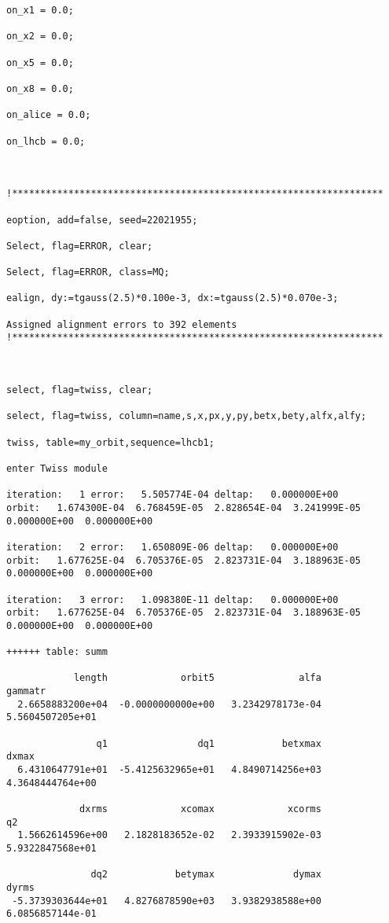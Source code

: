 \begin{verbatim}
on_x1 = 0.0;

on_x2 = 0.0;

on_x5 = 0.0;

on_x8 = 0.0;

on_alice = 0.0;

on_lhcb = 0.0;



!******************************************************************

eoption, add=false, seed=22021955;

Select, flag=ERROR, clear;

Select, flag=ERROR, class=MQ;

ealign, dy:=tgauss(2.5)*0.100e-3, dx:=tgauss(2.5)*0.070e-3;

Assigned alignment errors to 392 elements
!******************************************************************



select, flag=twiss, clear;

select, flag=twiss, column=name,s,x,px,y,py,betx,bety,alfx,alfy;

twiss, table=my_orbit,sequence=lhcb1;

enter Twiss module
  
iteration:   1 error:   5.505774E-04 deltap:   0.000000E+00
orbit:   1.674300E-04  6.768459E-05  2.828654E-04  3.241999E-05  0.000000E+00  0.000000E+00
  
iteration:   2 error:   1.650809E-06 deltap:   0.000000E+00
orbit:   1.677625E-04  6.705376E-05  2.823731E-04  3.188963E-05  0.000000E+00  0.000000E+00
  
iteration:   3 error:   1.098380E-11 deltap:   0.000000E+00
orbit:   1.677625E-04  6.705376E-05  2.823731E-04  3.188963E-05  0.000000E+00  0.000000E+00

++++++ table: summ

            length             orbit5               alfa            gammatr 
  2.6658883200e+04  -0.0000000000e+00   3.2342978173e-04   5.5604507205e+01 

                q1                dq1            betxmax              dxmax 
  6.4310647791e+01  -5.4125632965e+01   4.8490714256e+03   4.3648444764e+00 

             dxrms             xcomax             xcorms                 q2 
  1.5662614596e+00   2.1828183652e-02   2.3933915902e-03   5.9322847568e+01 

               dq2            betymax              dymax              dyrms 
 -5.3739303644e+01   4.8276878590e+03   3.9382938588e+00   6.0856857144e-01 


\end{verbatim}
